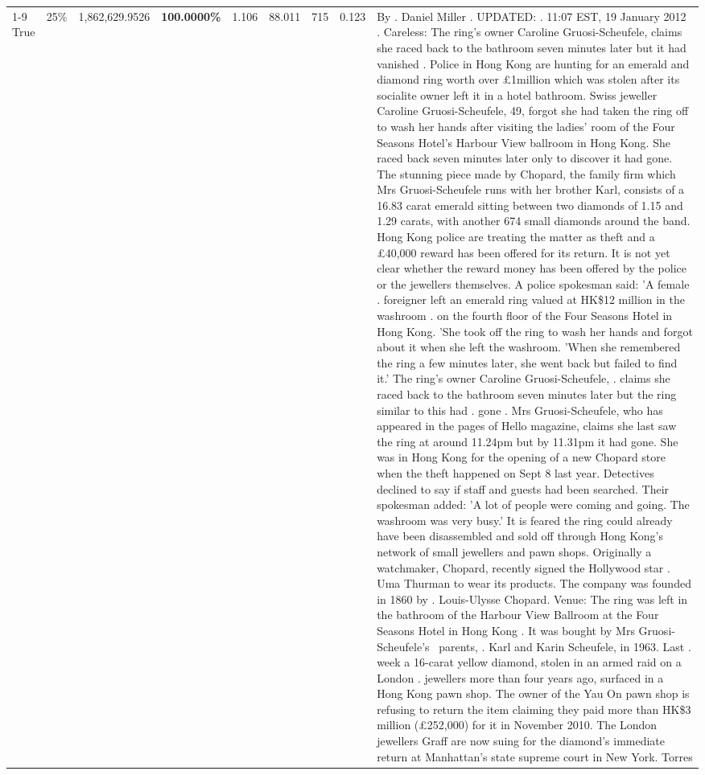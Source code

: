 \begin{table}[H]
\begin{tabular}{lllrlllll}
\cline{1-9} \cline{2-9}
True & 25\% & 1,862,629.9526 & \bfseries \color{red} 100.0000\% & 1.106 & 88.011 & 715 & 0.123 & By . Daniel Miller . UPDATED: . 11:07 EST, 19 January 2012 . Careless: The ring's owner Caroline Gruosi-Scheufele, claims she raced back to the bathroom seven minutes later but it had vanished . Police in Hong Kong are hunting for an emerald and diamond ring worth over £1million which was stolen after its socialite owner left it in a hotel bathroom. Swiss jeweller Caroline Gruosi-Scheufele, 49, forgot she had taken the ring off to wash her hands after visiting the ladies' room of the Four Seasons Hotel's Harbour View ballroom in Hong Kong. She raced back seven minutes later only to discover it had gone. The stunning piece made by Chopard, the family firm which Mrs Gruosi-Scheufele runs with her brother Karl, consists of a 16.83 carat emerald sitting between two diamonds of 1.15 and 1.29 carats, with another 674 small diamonds around the band. Hong Kong police are treating the matter as theft and a £40,000 reward has been offered for its return. It is not yet clear whether the reward money has been offered by the police or the jewellers themselves. A police spokesman said: 'A female . foreigner left an emerald ring valued at HK\$12 million in the washroom . on the fourth floor of the Four Seasons Hotel in Hong Kong. 'She took off the ring to wash her hands and forgot about it when she left the washroom. 'When she remembered the ring a few minutes later, she went back but failed to find it.' The ring's owner Caroline Gruosi-Scheufele, . claims she raced back to the bathroom seven minutes later but the ring similar to this had . gone . Mrs Gruosi-Scheufele, who has appeared in the pages of Hello magazine, claims she last saw the ring at around 11.24pm but by 11.31pm it had gone. She was in Hong Kong for the opening of a new Chopard store when the theft happened on Sept 8 last year. Detectives declined to say if staff and guests had been searched. Their spokesman added: 'A lot of people were coming and going. The washroom was very busy.' It is feared the ring could already have been disassembled and sold off through Hong Kong's network of small jewellers and pawn shops. Originally a watchmaker, Chopard, recently signed the Hollywood star . Uma Thurman to wear its products. The company was founded in 1860 by . Louis-Ulysse Chopard. Venue: The ring was left in the bathroom of the Harbour View Ballroom at the Four Seasons Hotel in Hong Kong . It was bought by Mrs Gruosi-Scheufele's  parents, . Karl and Karin Scheufele, in 1963. Last . week a 16-carat yellow diamond, stolen in an armed raid on a London . jewellers more than four years ago, surfaced in a Hong Kong pawn shop. The owner of the Yau On pawn shop is refusing to return the item claiming they paid more than HK\$3 million (£252,000) for it in November 2010. The London jewellers Graff are now suing for the diamond’s immediate return at Manhattan’s state supreme court in New York. Torres \\

\end{tabular}
\end{table}
